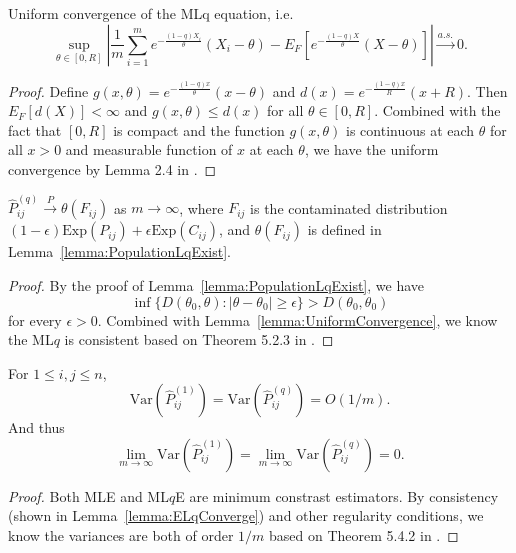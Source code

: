 \begin{lemma}
\label{lemma:UniformConvergence}
Uniform convergence of the MLq equation, i.e.\
\[
	\sup_{\theta \in [0, R]} \left| \frac{1}{m} \sum_{i=1}^m e^{-\frac{(1-q) X_i}{\theta}}(X_i - \theta) - E_F[e^{-\frac{(1-q) X}{\theta}}(X - \theta)] \right| \stackrel{a.s.}{\to} 0.
\]
\end{lemma}
\begin{proof}
Define $g(x,\theta) = e^{-\frac{(1-q) x}{\theta}}(x - \theta)$ and $d(x) = e^{-\frac{(1-q)x}{R}}(x + R)$. Then $E_F[d(X)] < \infty$ and $g(x,\theta) \le d(x)$ for all $\theta \in [0, R]$.
Combined with the fact that $[0, R]$ is compact and the function $g(x,\theta)$ is continuous at each $\theta$ for all $x > 0$ and measurable function of $x$ at each $\theta$, we have the uniform convergence by Lemma 2.4 in \citep{newey1994large}.
\end{proof}

\begin{lemma}
\label{lemma:ELqConverge}
$\hat{P}_{ij}^{(q)} \stackrel{P}{\to} \theta(F_{ij})$ as $m \to \infty$, where $F_{ij}$ is the contaminated distribution $(1-\epsilon) \mathrm{Exp}(P_{ij}) + \epsilon \mathrm{Exp}(C_{ij})$, and $ \theta(F_{ij})$ is defined in Lemma~\ref{lemma:PopulationLqExist}. 
\end{lemma}
\begin{proof}
By the proof of Lemma~\ref{lemma:PopulationLqExist}, we have
\[
	\inf\{D(\theta_0, \theta): |\theta - \theta_0| \ge \epsilon \} > D(\theta_0, \theta_0)
\]
for every $\epsilon > 0$. Combined with Lemma~\ref{lemma:UniformConvergence}, we know the ML$q$ is consistent based on Theorem 5.2.3 in \citep{bickel2007mathematical}.
\end{proof}

\begin{lemma}
\label{lemma:VarLqlVarMLEproof}
For $1 \le i, j \le n$, 
\[
	\mathrm{Var}(\hat{P}^{(1)}_{ij})
    = \mathrm{Var}(\hat{P}^{(q)}_{ij}) = O(1/m).
\]
And thus
\[
	\lim_{m \to \infty} \mathrm{Var}(\hat{P}^{(1)}_{ij})
    = \lim_{m \to \infty} \mathrm{Var}(\hat{P}^{(q)}_{ij}) = 0.
\]
\end{lemma}
\begin{proof}
Both MLE and ML$q$E are minimum constrast estimators. By consistency (shown in Lemma~\ref{lemma:ELqConverge}) and other regularity conditions, we know the variances are both of order $1/m$ based on Theorem 5.4.2 in \citep{bickel2007mathematical}.
\end{proof}



